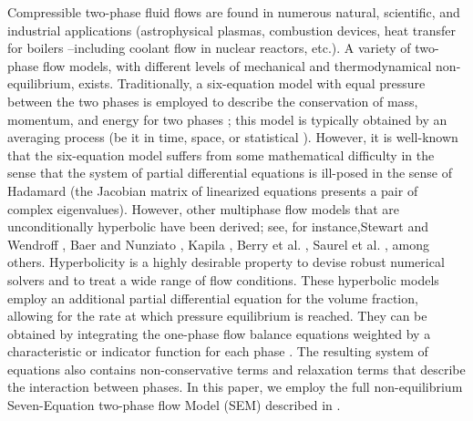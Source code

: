 \documentclass[preprint,10pt]{elsarticle}
\begin{document}
Compressible two-phase fluid flows are found in numerous natural, scientific, and industrial applications (astrophysical plasmas, 
combustion devices, heat transfer for boilers --including coolant flow in nuclear reactors, etc.). 
A variety of two-phase flow models, with different levels of mechanical and thermodynamical non-equilibrium, exists. 
Traditionally, a six-equation model with equal pressure between the two phases is employed to describe the conservation of mass, 
momentum, and energy for two phases \cite{Stadtke}; this model is typically obtained by an averaging process (be it in time, space,
or statistical \cite{BruceStewart1984363}). However, it is well-known that the six-equation model 
suffers from some mathematical difficulty in the sense that the system of partial differential equations is ill-posed in the sense of Hadamard 
(the Jacobian matrix of linearized equations presents a pair of complex eigenvalues). 
However, other multiphase flow models that are unconditionally hyperbolic have been derived; see, for instance,Stewart and Wendroff \cite{BruceStewart1984363}, 
Baer and Nunziato \cite{BaerNunziato}, Kapila \cite{Kapila_2001,Berry_NED2010}, Berry et al. \cite{Berry_1985}, Saurel et al. \cite{Saurel_2001a,Saurel_2001b}, 
among others. Hyperbolicity is a highly desirable property to devise robust numerical solvers and to treat a wide range of flow conditions.
These hyperbolic models employ an additional partial differential equation for the volume fraction, allowing for the rate at 
which pressure equilibrium is reached.  They can be obtained by integrating the one-phase flow balance equations weighted by a characteristic 
or indicator function for each phase \cite{DrewPassman}. The resulting system of equations also contains non-conservative terms and relaxation terms that 
describe the interaction between phases. In this paper, we employ the full non-equilibrium Seven-Equation two-phase flow Model 
(SEM) described in \cite{Berry_1985,BaerNunziato,Saurel_2001b,Berry_NED2010}.
\end{document}
